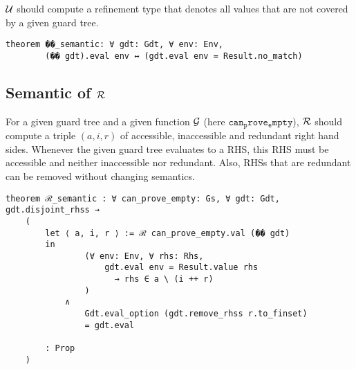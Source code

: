 $\mathcal{U}$ should compute a refinement type that denotes all values that are not covered by a given guard tree.

\begin{verbatim}
theorem ��_semantic: ∀ gdt: Gdt, ∀ env: Env,
        (�� gdt).eval env ↔ (gdt.eval env = Result.no_match)
\end{verbatim}

\subsection{Semantic of $\mathcal{R}$}

For a given guard tree and a given function $\mathcal{G}$ (here $\mathtt{can_prove_empty}$), $\mathcal{R}$
should compute a triple $(a, i, r)$ of accessible, inaccessible and redundant right hand sides.
Whenever the given guard tree evaluates to a RHS, this RHS must be accessible and neither inaccessible nor redundant.
Also, RHSs that are redundant can be removed without changing semantics.

\begin{verbatim}
theorem ℛ_semantic : ∀ can_prove_empty: Gs, ∀ gdt: Gdt, gdt.disjoint_rhss → 
    (
        let ⟨ a, i, r ⟩ := ℛ can_prove_empty.val (�� gdt)
        in
                (∀ env: Env, ∀ rhs: Rhs,
                    gdt.eval env = Result.value rhs
                      → rhs ∈ a \ (i ++ r)
                )
            ∧
                Gdt.eval_option (gdt.remove_rhss r.to_finset)
                = gdt.eval

        : Prop
    )
\end{verbatim}
